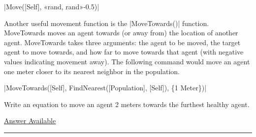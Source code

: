\documentclass[]{memoir}
\newcommand{\DecValTok}[1]{\textcolor[rgb]{0.25,0.63,0.44}{{#1}}}
\newcommand{\FloatTok}[1]{\textcolor[rgb]{0.25,0.63,0.44}{{#1}}}
\newcommand{\FunctionTok}[1]{\textcolor[rgb]{0.02,0.16,0.49}{{#1}}}
\newcommand{\NormalTok}[1]{{#1}}
\begin{document}
|\FunctionTok{Move}\NormalTok{([Self], «rand, rand»-}\FloatTok{0.5}\NormalTok{)}|

Another useful movement function is the
|\FunctionTok{MoveTowards}\NormalTok{()}| function. MoveTowards moves an
agent towards (or away from) the location of another agent. MoveTowards
takes three arguments: the agent to be moved, the target agent to move
towards, and how far to move towards that agent (with negative values
indicating movement away). The following command would move an agent one
meter closer to its nearest neighbor in the population.

|\FunctionTok{MoveTowards}\NormalTok{([Self], }\FunctionTok{FindNearest}\NormalTok{([Population], [Self]), \{}\DecValTok{1} \NormalTok{Meter\})}|


Write an equation to move an agent 2 meters towards the furthest healthy
agent.

\hyperref[Ans-13-11]{Answer Available}

\begin{center}\rule{3in}{0.4pt}\end{center}

\FloatBarrier 
\end{document}
